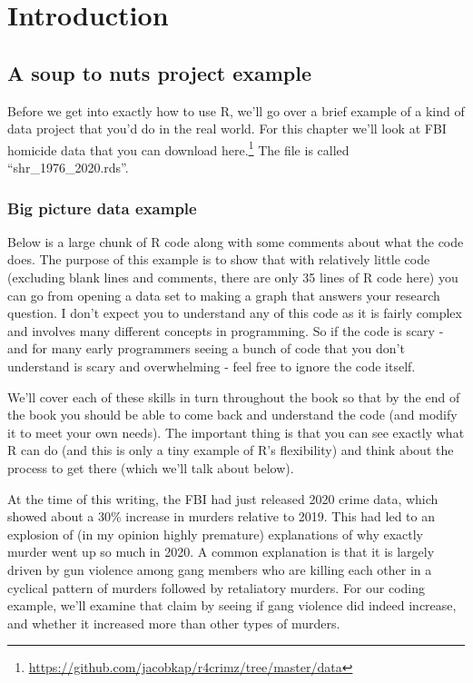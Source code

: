 \documentclass[
  a4paper,
]{krantz}
\renewcommand{\href}[2]{#2\footnote{\url{#1}}}
\begin{document}
\mainmatter

\hypertarget{part-introduction}{%
\part{Introduction}\label{part-introduction}}

\hypertarget{a-soup-to-nuts-project-example}{%
\chapter{A soup to nuts project
example}\label{a-soup-to-nuts-project-example}}

Before we get into exactly how to use R, we'll go over a
brief example of a kind of data project that you'd do in the
real world. For this chapter we'll look at FBI homicide data
that you can download
\href{https://github.com/jacobkap/r4crimz/tree/master/data}{here.}
The file is called ``shr\_1976\_2020.rds''.

\hypertarget{big-picture-data-example}{%
\section{Big picture data
example}\label{big-picture-data-example}}

Below is a large chunk of R code along with some comments
about what the code does. The purpose of this example is to
show that with relatively little code (excluding blank lines
and comments, there are only 35 lines of R code here) you
can go from opening a data set to making a graph that
answers your research question. I don't expect you to
understand any of this code as it is fairly complex and
involves many different concepts in programming. So if the
code is scary - and for many early programmers seeing a
bunch of code that you don't understand is scary and
overwhelming - feel free to ignore the code itself.

We'll cover each of these skills in turn throughout the book
so that by the end of the book you should be able to come
back and understand the code (and modify it to meet your own
needs). The important thing is that you can see exactly what
R can do (and this is only a tiny example of R's
flexibility) and think about the process to get there (which
we'll talk about below).

At the time of this writing, the FBI had just released 2020
crime data, which showed about a 30\% increase in murders
relative to 2019. This had led to an explosion of (in my
opinion highly premature) explanations of why exactly murder
went up so much in 2020. A common explanation is that it is
largely driven by gun violence among gang members who are
killing each other in a cyclical pattern of murders followed
by retaliatory murders. For our coding example, we'll
examine that claim by seeing if gang violence did indeed
increase, and whether it increased more than other types of
murders.
\end{document}
